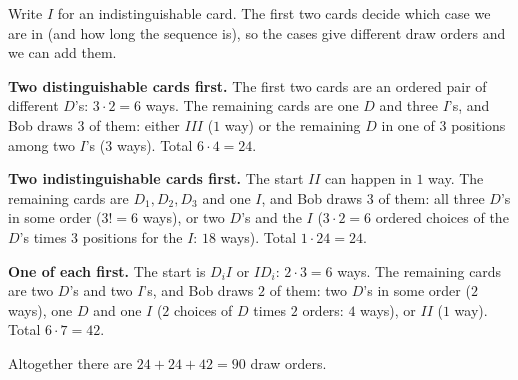 Write $I$ for an indistinguishable card. The first two cards decide which case we are in (and how long the sequence is), so the cases give different draw orders and we can add them.

\textbf{Two distinguishable cards first.} The first two cards are an ordered pair of different $D$'s: $3\cdot2=6$ ways. The remaining cards are one $D$ and three $I$'s, and Bob draws $3$ of them: either $III$ ($1$ way) or the remaining $D$ in one of $3$ positions among two $I$'s ($3$ ways). Total $6\cdot4=24$.

\textbf{Two indistinguishable cards first.} The start $II$ can happen in $1$ way. The remaining cards are $D_1,D_2,D_3$ and one $I$, and Bob draws $3$ of them: all three $D$'s in some order ($3!=6$ ways), or two $D$'s and the $I$ ($3\cdot2=6$ ordered choices of the $D$'s times $3$ positions for the $I$: $18$ ways). Total $1\cdot24=24$.

\textbf{One of each first.} The start is $D_iI$ or $ID_i$: $2\cdot3=6$ ways. The remaining cards are two $D$'s and two $I$'s, and Bob draws $2$ of them: two $D$'s in some order ($2$ ways), one $D$ and one $I$ ($2$ choices of $D$ times $2$ orders: $4$ ways), or $II$ ($1$ way). Total $6\cdot7=42$.

Altogether there are $24+24+42=\boxed{90}$ draw orders.
